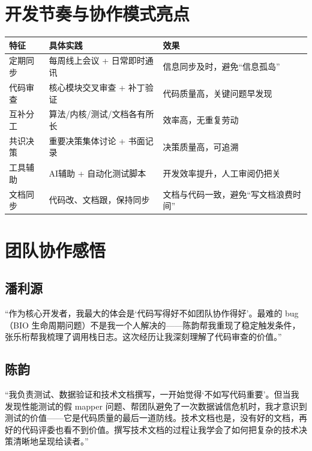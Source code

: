 \section{开发节奏与协作模式亮点}

\begin{table}[H]
    \centering
    \begin{tabular}{p{}p{}p{}}
        \toprule
        \textbf{特征} & \textbf{具体实践} & \textbf{效果} \\
        \midrule
        定期同步 & 每周线上会议 + 日常即时通讯 & 信息同步及时，避免“信息孤岛” \\
        代码审查 & 核心模块交叉审查 + 补丁验证 & 代码质量高，关键问题早发现 \\
        互补分工 & 算法/内核/测试/文档各有所长 & 效率高，无重复劳动 \\
        共识决策 & 重要决策集体讨论 + 书面记录 & 决策质量高，可追溯 \\
        工具辅助 & AI辅助 + 自动化测试脚本 & 开发效率提升，人工审阅仍把关 \\
        文档同步 & 代码改、文档跟，保持同步 & 文档与代码一致，避免“写文档浪费时间” \\
        \bottomrule
    \end{tabular}
\end{table}

\section{团队协作感悟}

\subsection{潘利源}
“作为核心开发者，我最大的体会是‘代码写得好不如团队协作得好’。最难的 bug（BIO 生命周期问题）不是我一个人解决的——陈韵帮我重现了稳定触发条件，张乐桁帮我梳理了调用栈日志。这次经历让我深刻理解了代码审查的价值。”

\subsection{陈韵}
“我负责测试、数据验证和技术文档撰写，一开始觉得‘不如写代码重要’。但当我发现性能测试的假 mapper 问题、帮团队避免了一次数据诚信危机时，我才意识到测试的价值——它是代码质量的最后一道防线。技术文档也是，没有好的文档，再好的代码评委也看不到价值。撰写技术文档的过程让我学会了如何把复杂的技术决策清晰地呈现给读者。”

